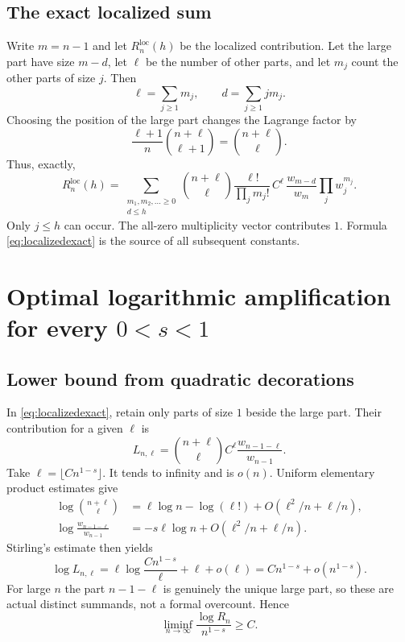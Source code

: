 \documentclass[11pt,a4paper]{article}
\theoremstyle{definition}
\theoremstyle{remark}
\numberwithin{equation}{section}
\begin{document}
\subsection{The exact localized sum}
Write $m=n-1$ and let $R_n^{\mathrm{loc}}(h)$ be the localized
contribution. Let the large part have size $m-d$, let $\ell$ be the
number of other parts, and let $m_j$ count the other parts of size $j$.
Then
\begin{equation}
 \ell=\sum_{j\ge1}m_j,\qquad d=\sum_{j\ge1}jm_j.
 \label{eq:counts}
\end{equation}
Choosing the position of the large part changes the Lagrange factor by
\[
 \frac{\ell+1}{n}\binom{n+\ell}{\ell+1}=\binom{n+\ell}{\ell}.
\]
Thus, exactly,
\begin{equation}
 R_n^{\mathrm{loc}}(h)=
 \sum_{\substack{m_1,m_2,\ldots\ge0\\d\le h}}
 \binom{n+\ell}{\ell}\frac{\ell!}{\prod_jm_j!}\,
 C^\ell\,\frac{w_{m-d}}{w_m}\prod_jw_j^{m_j}.
 \label{eq:localizedexact}
\end{equation}
Only $j\le h$ can occur. The all-zero multiplicity vector contributes
$1$. Formula \eqref{eq:localizedexact} is the source of all subsequent
constants.

\section{Optimal logarithmic amplification for every \texorpdfstring{$0<s<1$}{0 < s < 1}}
\label{sec:logcost}

\subsection{Lower bound from quadratic decorations}
In \eqref{eq:localizedexact}, retain only parts of size $1$ beside the
large part. Their contribution for a given $\ell$ is
\begin{equation}
 L_{n,\ell}=\binom{n+\ell}{\ell} C^\ell
             \frac{w_{n-1-\ell}}{w_{n-1}}.
 \label{eq:ones}
\end{equation}
Take $\ell=\lfloor Cn^{1-s}\rfloor$. It tends to infinity and is
$o(n)$. Uniform elementary product estimates give
\begin{align}
 \log\binom{n+\ell}{\ell}
    &=\ell\log n-\log(\ell!)+O(\ell^2/n+\ell/n),\\
 \log\frac{w_{n-1-\ell}}{w_{n-1}}
    &=-s\ell\log n+O(\ell^2/n+\ell/n).
 \label{eq:onesest}
\end{align}
Stirling's estimate then yields
\[
 \log L_{n,\ell}
 =\ell\log\frac{Cn^{1-s}}{\ell}+\ell+o(\ell)
 =Cn^{1-s}+o(n^{1-s}).
\]
For large $n$ the part $n-1-\ell$ is genuinely the unique large part,
so these are actual distinct summands, not a formal overcount. Hence
\begin{equation}
 \liminf_{n\to\infty}\frac{\log R_n}{n^{1-s}}\ge C.
 \label{eq:lowercost}
\end{equation}
\end{document}
